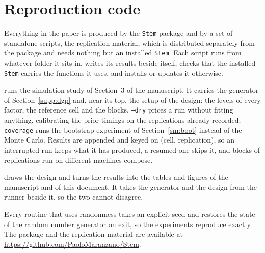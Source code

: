 \documentclass[11pt]{article}
\newcommand{\Stem}{\texttt{Stem}}
\begin{document}
\section{Reproduction code}\label{sm:code}

Everything in the paper is produced by the \Stem{} package \citep{StemPackage} and by a set of standalone scripts, the replication material, which is distributed separately from the package and needs nothing but an installed \Stem{}. Each script runs from whatever folder it sits in, writes its results beside itself, checks that the installed \Stem{} carries the functions it uses, and installs or updates it otherwise.

\begin{description}[leftmargin=1.6em,itemsep=3pt,topsep=3pt]
  \item[\texttt{run-simulations.R}] runs the simulation study of Section~3 of the manuscript. It carries the generator of Section~\ref{supp:dgp} and, near its top, the setup of the design: the levels of every factor, the reference cell and the blocks. \texttt{--dry} prices a run without fitting anything, calibrating the prior timings on the replications already recorded; \texttt{--coverage} runs the bootstrap experiment of Section~\ref{sm:boot} instead of the Monte Carlo. Results are appended and keyed on (cell, replication), so an interrupted run keeps what it has produced, a resumed one skips it, and blocks of replications run on different machines compose.
  \item[\texttt{analyse-simulations.R}] draws the design and turns the results into the tables and figures of the manuscript and of this document. It takes the generator and the design from the runner beside it, so the two cannot disagree.
\end{description}

Every routine that uses randomness takes an explicit seed and restores the state of the random number generator on exit, so the experiments reproduce exactly. The package and the replication material are available at \url{https://github.com/PaoloMaranzano/Stem}.



\end{document}
